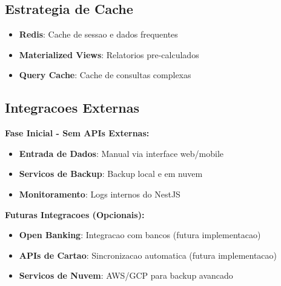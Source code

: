 \subsection{Estrategia de Cache}

\begin{itemize}
    \item \textbf{Redis}: Cache de sessao e dados frequentes
    \item \textbf{Materialized Views}: Relatorios pre-calculados
    \item \textbf{Query Cache}: Cache de consultas complexas
\end{itemize}

\subsection{Integracoes Externas}

\textbf{Fase Inicial - Sem APIs Externas:}
\begin{itemize}
    \item \textbf{Entrada de Dados}: Manual via interface web/mobile
    \item \textbf{Servicos de Backup}: Backup local e em nuvem
    \item \textbf{Monitoramento}: Logs internos do NestJS
\end{itemize}

\textbf{Futuras Integracoes (Opcionais):}
\begin{itemize}
    \item \textbf{Open Banking}: Integracao com bancos (futura implementacao)
    \item \textbf{APIs de Cartao}: Sincronizacao automatica (futura implementacao)
    \item \textbf{Servicos de Nuvem}: AWS/GCP para backup avancado
\end{itemize}
